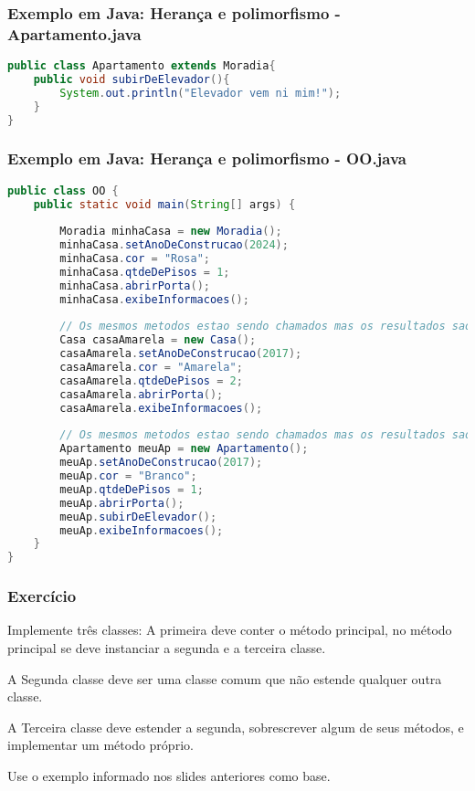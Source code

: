 \begin{frame}[fragile]
	\frametitle{Exemplo em Java: Herança e polimorfismo - Apartamento.java}
	\begin{lstlisting}[language=java]
public class Apartamento extends Moradia{
	public void subirDeElevador(){
		System.out.println("Elevador vem ni mim!");
	}
}
	\end{lstlisting}
\end{frame}

\begin{frame}[fragile]
	\frametitle{Exemplo em Java: Herança e polimorfismo - OO.java}
	\begin{lstlisting}[language=java]
public class OO {
	public static void main(String[] args) {
		
		Moradia minhaCasa = new Moradia();
		minhaCasa.setAnoDeConstrucao(2024);
		minhaCasa.cor = "Rosa";
		minhaCasa.qtdeDePisos = 1;
		minhaCasa.abrirPorta();
		minhaCasa.exibeInformacoes();
		
		// Os mesmos metodos estao sendo chamados mas os resultados sao diferentes gracas a heranca e ao polimorfismo
		Casa casaAmarela = new Casa();
		casaAmarela.setAnoDeConstrucao(2017);
		casaAmarela.cor = "Amarela";
		casaAmarela.qtdeDePisos = 2;
		casaAmarela.abrirPorta();
		casaAmarela.exibeInformacoes();
		
		// Os mesmos metodos estao sendo chamados mas os resultados sao diferentes gracas a heranca e ao polimorfismo e mais, tambem ha um metodo a mais: subirDeElevador()
		Apartamento meuAp = new Apartamento();
		meuAp.setAnoDeConstrucao(2017);
		meuAp.cor = "Branco";
		meuAp.qtdeDePisos = 1;
		meuAp.abrirPorta();
		meuAp.subirDeElevador();
		meuAp.exibeInformacoes();
	}
}
	\end{lstlisting}
\end{frame}

\begin{frame}
	\frametitle{Exercício}
	\par Implemente três classes:
	A primeira deve conter o método principal, no método principal se deve instanciar a segunda e a terceira classe.
	\par A Segunda classe deve ser uma classe comum que não estende qualquer  outra classe.
	\par A Terceira classe deve estender a segunda, sobrescrever algum de seus métodos, e implementar um método próprio. 
	\par Use o exemplo informado nos slides anteriores como base. 
\end{frame}